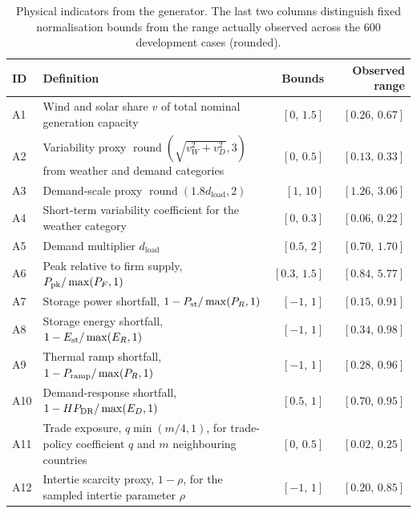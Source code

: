 \documentclass[11pt,a4paper]{article}
\newcommand{\rnd}{\operatorname{round}}
\newcommand{\tablefont}{\small\renewcommand{\arraystretch}{1.14}}
\begin{document}
\begin{table}[htbp]\centering\tablefont
\caption{Physical indicators from the generator. The last two columns distinguish fixed normalisation bounds from the range actually observed across the 600 development cases (rounded).}\label{tab:physical}
\begin{tabularx}{\linewidth}{@{}l L r r@{}}\toprule
ID & Definition & Bounds & Observed range\\\midrule
A1 & Wind and solar share \(v\) of total nominal generation capacity & \([0,\,1.5]\) & \([0.26,\,0.67]\)\\
A2 & Variability proxy \(\rnd(\sqrt{v_W^2+v_D^2},3)\) from weather and demand categories & \([0,\,0.5]\) & \([0.13,\,0.33]\)\\
A3 & Demand-scale proxy \(\rnd(1.8d_\mathrm{load},2)\) & \([1,\,10]\) & \([1.26,\,3.06]\)\\
A4 & Short-term variability coefficient for the weather category & \([0,\,0.3]\) & \([0.06,\,0.22]\)\\
A5 & Demand multiplier \(d_\mathrm{load}\) & \([0.5,\,2]\) & \([0.70,\,1.70]\)\\
A6 & Peak relative to firm supply, \(P_{\rm pk}/\max(P_F,1)\) & \([0.3,\,1.5]\) & \([0.84,\,5.77]\)\\
A7 & Storage power shortfall, \(1-P_{\rm st}/\max(P_R,1)\) & \([-1,\,1]\) & \([0.15,\,0.91]\)\\
A8 & Storage energy shortfall, \(1-E_{\rm st}/\max(E_R,1)\) & \([-1,\,1]\) & \([0.34,\,0.98]\)\\
A9 & Thermal ramp shortfall, \(1-P_{\rm ramp}/\max(P_R,1)\) & \([-1,\,1]\) & \([0.28,\,0.96]\)\\
A10 & Demand-response shortfall, \(1-HP_{\rm DR}/\max(E_D,1)\) & \([0.5,\,1]\) & \([0.70,\,0.95]\)\\
A11 & Trade exposure, \(q\min(m/4,1)\), for trade-policy coefficient \(q\) and \(m\) neighbouring countries & \([0,\,0.5]\) & \([0.02,\,0.25]\)\\
A12 & Intertie scarcity proxy, \(1-\rho\), for the sampled intertie parameter \(\rho\) & \([-1,\,1]\) & \([0.20,\,0.85]\)\\
\bottomrule\end{tabularx}
\end{table}
\end{document}
